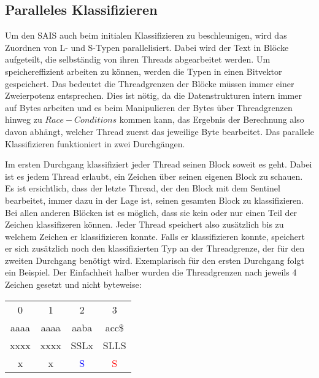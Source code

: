 \subsection{Paralleles Klassifizieren}
\label{subsection:psais_classifying}

Um den SAIS auch beim initialen Klassifizieren zu beschleunigen, wird das Zuordnen von L- und S-Typen parallelisiert. Dabei wird der Text in Blöcke aufgeteilt, die selbständig von ihren Threads abgearbeitet werden. Um speichereffizient arbeiten zu können, werden die Typen in einen Bitvektor gespeichert. Das bedeutet die Threadgrenzen der Blöcke müssen immer einer Zweierpotenz entsprechen. Dies ist nötig, da die Datenstrukturen intern immer auf Bytes arbeiten und es beim Manipulieren der Bytes über Threadgrenzen hinweg zu $Race-Conditions$ kommen kann, das Ergebnis der Berechnung also davon abhängt, welcher Thread zuerst das jeweilige Byte bearbeitet.
Das parallele Klassifizieren funktioniert in zwei Durchgängen. 

Im ersten Durchgang klassifiziert jeder Thread seinen Block soweit es geht. Dabei ist es jedem Thread erlaubt, ein Zeichen über seinen eigenen Block zu schauen. Es ist ersichtlich, dass der letzte Thread, der den Block mit dem Sentinel bearbeitet, immer dazu in der Lage ist, seinen gesamten Block zu klassifizieren. Bei allen anderen Blöcken ist es möglich, dass sie kein oder nur einen Teil der Zeichen klassifizeren können. Jeder Thread speichert also zusätzlich bis zu welchem Zeichen er klassifizieren konnte. Falls er klassifizieren konnte, speichert er sich zusätzlich noch den klassifizierten Typ an der Threadgrenze, der für den zweiten Durchgang benötigt wird.
Exemplarisch für den ersten Durchgang folgt ein Beispiel. Der Einfachheit halber wurden die Threadgrenzen nach jeweils 4 Zeichen gesetzt und nicht byteweise:

\begin{center}
	\begin{tabular}{c|c|c|c}     
	           0     &             1         &           2          			&             3    \\   
          	aaaa     &          aaaa         &        aaba           			&          acc\$    \\            
         	xxxx     &          xxxx         &        SSLx           			&          SLLS     \\     
         	  x      &            x          &   \textcolor{blue}{S}            &          \textcolor{red}{S}      \\            	       
	\end{tabular}
\end{center}

